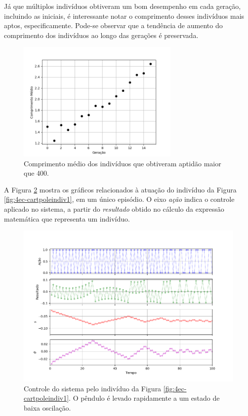 Já que múltiplos indivíduos obtiveram um bom desempenho em cada geração, incluindo as iniciais, é interessante notar o comprimento desses indivíduos mais aptos, especificamente. Pode-se observar que a tendência de aumento do comprimento dos indivíduos ao longo das gerações é preservada.

\begin{figure}[H]
	\centering
	\includegraphics[width=0.7\textwidth]{02_desenvolvimento/compr_medio.png}
	\caption{Comprimento médio dos indivíduos que obtiveram aptidão maior que 400.}
	\label{fig:4ec-cartpolegrafaval}
\end{figure}

A Figura \ref{fig:4ec-cartpolegrafaval} mostra os gráficos relacionados à atuação do indivíduo da Figura \ref{fig:4ec-cartpoleindiv1}, em um único episódio. O eixo \textit{ação} indica o controle aplicado no sistema, a partir do \textit{resultado} obtido no cálculo da expressão matemática que representa um indivíduo.

\begin{figure}[H]
	\centering
	\includegraphics[width=\textwidth]{02_desenvolvimento/04_EC_Fig_CartpoleGraficosAval.png}
	\caption{Controle do sistema pelo indivíduo da Figura \ref{fig:4ec-cartpoleindiv1}. O pêndulo é levado rapidamente a um estado de baixa oscilação.}
	\label{fig:4ec-cartpolegrafaval}
\end{figure}

